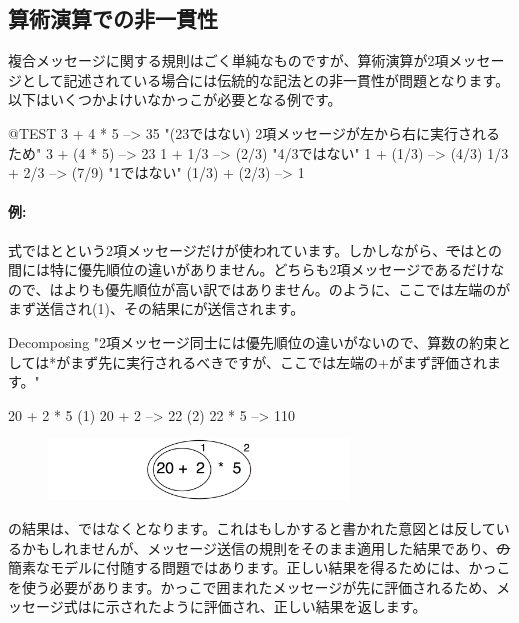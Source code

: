 \documentclass[a4paper,10pt,twoside]{book}
\begin{document}
\subsection{算術演算での非一貫性}
複合メッセージに関する規則はごく単純なものですが、算術演算が2項メッセージとして記述されている場合には伝統的な記法との非一貫性が問題となります。以下はいくつかよけいなかっこが必要となる例です。

\begin{code}{@TEST}
3 + 4 * 5      --> 35    "(23ではない)  2項メッセージが左から右に実行されるため"
3 + (4 * 5)    --> 23
1 + 1/3         --> (2/3)    "4/3ではない"
1 + (1/3)       --> (4/3)
1/3 + 2/3       --> (7/9)    "1ではない"
(1/3) + (2/3)  --> 1
\end{code}

\paragraph{例:}
式では\ct{+}と\ct{*}という2項メッセージだけが使われています。しかしながら、\st では\ct{+}と\ct{*}の間には特に優先順位の違いがありません。どちらも2項メッセージであるだけなので、\ct{*}は\ct{+}よりも優先順位が高い訳ではありません。のように、ここでは左端の\ct{+}がまず送信され(1)、その結果に\ct{*}が送信されます。

\begin{example}[binaryMessages1]{Decomposing }{}
"2項メッセージ同士には優先順位の違いがないので、算数の約束としては*がまず先に実行されるべきですが、ここでは左端の+がまず評価されます。"

      20 + 2 * 5 
(1)  20 + 2 --> 22
(2)  22       * 5 --> 110
\end{example}

\begin{figure}
\begin{center}\includegraphics[width=8cm]{ucompoNoBracketPar}\end{center}
\end{figure}
\noindent
{}の結果は、ではなくとなります。これはもしかすると書かれた意図とは反しているかもしれませんが、メッセージ送信の規則をそのまま適用した結果であり、\st の簡素なモデルに付随する問題ではあります。正しい結果を得るためには、かっこを使う必要があります。かっこで囲まれたメッセージが先に評価されるため、メッセージ式はに示されたように評価され、正しい結果を返します。
\end{document}
